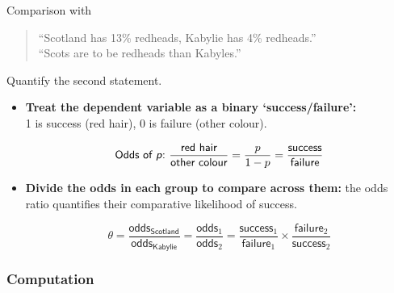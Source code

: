 \documentclass{beamer}
\begin{document}
	\begin{frame}[t]{Comparison with }
					
		\begin{quote}
		``Scotland has 13\% redheads, Kabylie has 4\% redheads.''\\
		``Scots are  to be redheads than Kabyles.''
		\end{quote}
		
		Quantify the second statement.

		\begin{itemize}
			\item \textbf{Treat the dependent variable as a binary `success/failure':}\\1 is success (red hair), 0 is failure (other colour).
						
			$$\textsf{Odds of \textit{p}:~}\frac{\textsf{red hair}}{\textsf{other colour}}=\frac{p}{1-p}=\frac{\textsf{success}}{\textsf{failure}}$$
			\vspace{0em}
			
			\item \textbf{Divide the odds in each group to compare across them:} the odds ratio quantifies their comparative likelihood of success.
			
			$$\theta = \frac{\textsf{odds}_{\textsf{Scotland}}}{\textsf{odds}_{\textsf{Kabylie}}}=\frac{\textsf{odds}_1}{\textsf{odds}_2}=\frac{\textsf{success}_1}{\textsf{failure}_1}\times\frac{\textsf{failure}_2}{\textsf{success}_2}$$
						
		\end{itemize}

	\end{frame}
	
	\subsubsection{Computation}
\end{document}
